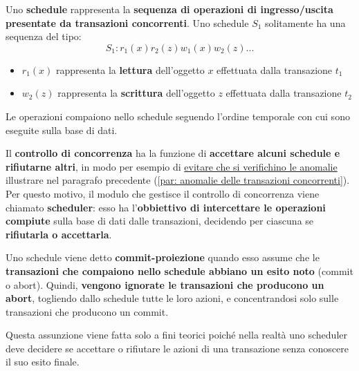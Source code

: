 \documentclass[a4paper]{article}
\begin{document}
	Uno \textcolor{Red3}{\textbf{schedule}} rappresenta la \textbf{sequenza di operazioni di ingresso/uscita presentate da transazioni concorrenti}. Uno schedule $S_{1}$ solitamente ha una sequenza del tipo:
	\begin{equation*}
		S_{1} : r_{1}\left(x\right) r_{2}\left(z\right) w_{1}\left(x\right) w_{2}\left(z\right) ...
	\end{equation*}
	\begin{itemize}
		\item $r_{1}\left(x\right)$ rappresenta la \textbf{lettura} dell'oggetto $x$ effettuata dalla transazione $t_{1}$
		\item $w_{2}\left(z\right)$ rappresenta la \textbf{scrittura} dell'oggetto $z$ effettuata dalla transazione $t_{2}$
	\end{itemize}
	Le operazioni compaiono nello schedule seguendo l'ordine temporale con cui sono eseguite sulla base di dati.\newline
	
	\noindent
	Il \textbf{controllo di concorrenza} ha la funzione di \textbf{accettare alcuni schedule e rifiutarne altri}, in modo per esempio di \underline{evitare che si verifichino le anomalie} illustrare nel paragrafo precedente (\ref{par: anomalie delle transazioni concorrenti}). Per questo motivo, il modulo che gestisce il controllo di concorrenza viene chiamato \textcolor{Red3}{\textbf{scheduler}}: esso ha l'\textbf{obbiettivo di intercettare le operazioni compiute} sulla base di dati dalle transazioni, decidendo per ciascuna se \textbf{rifiutarla o accettarla}.\newline
	
	\noindent
	Uno schedule viene detto \textcolor{Red3}{\textbf{commit-proiezione}} quando esso assume che le \textbf{transazioni che compaiono nello schedule abbiano un esito noto} (\textsf{commit} o \textsf{abort}). Quindi, \textbf{vengono ignorate le transazioni che producono un \textsf{abort}}, togliendo dallo schedule tutte le loro azioni, e concentrandosi solo sulle transazioni che producono un \textsf{commit}.
	
	Questa assunzione viene fatta solo a fini teorici poiché nella realtà uno scheduler deve decidere se accettare o rifiutare le azioni di una transazione senza conoscere il suo esito finale.\newline
	
\end{document}
